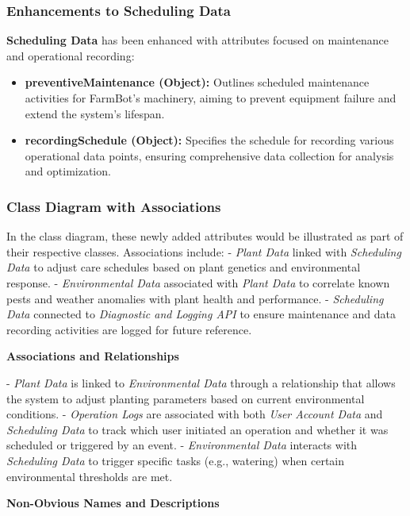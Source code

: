 \subsubsection{Enhancements to Scheduling Data}

\textbf{Scheduling Data} has been enhanced with attributes focused on maintenance and operational recording:

\begin{itemize}
    \item \textbf{preventiveMaintenance (Object):} Outlines scheduled maintenance activities for FarmBot's machinery, aiming to prevent equipment failure and extend the system's lifespan.
    \item \textbf{recordingSchedule (Object):} Specifies the schedule for recording various operational data points, ensuring comprehensive data collection for analysis and optimization.
\end{itemize}

\subsubsection{Class Diagram with Associations}
In the class diagram, these newly added attributes would be illustrated as part of their respective classes. Associations include:
- \textit{Plant Data} linked with \textit{Scheduling Data} to adjust care schedules based on plant genetics and environmental response.
- \textit{Environmental Data} associated with \textit{Plant Data} to correlate known pests and weather anomalies with plant health and performance.
- \textit{Scheduling Data} connected to \textit{Diagnostic and Logging API} to ensure maintenance and data recording activities are logged for future reference.

\textbf{Associations and Relationships}

- \textit{Plant Data} is linked to \textit{Environmental Data} through a relationship that allows the system to adjust planting parameters based on current environmental conditions.
- \textit{Operation Logs} are associated with both \textit{User Account Data} and \textit{Scheduling Data} to track which user initiated an operation and whether it was scheduled or triggered by an event.
- \textit{Environmental Data} interacts with \textit{Scheduling Data} to trigger specific tasks (e.g., watering) when certain environmental thresholds are met.

\textbf{Non-Obvious Names and Descriptions}

